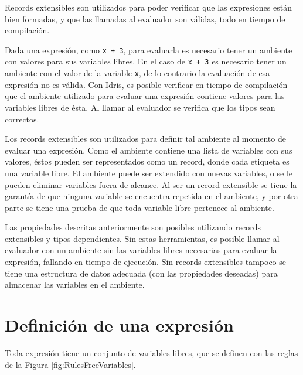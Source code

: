 Records extensibles son utilizados para poder verificar que las expresiones están bien formadas, y que las llamadas al evaluador son válidas, todo en tiempo de compilación.

Dada una expresión, como \texttt{x + 3}, para evaluarla es necesario tener un ambiente con valores para sus variables libres. En el caso de \texttt{x + 3} es necesario tener un ambiente con el valor de la variable \texttt{x}, de lo contrario la evaluación de esa expresión no es válida. Con Idris, es posible verificar en tiempo de compilación que el ambiente utilizado para evaluar una expresión contiene valores para las variables libres de ésta. Al llamar al evaluador se verifica que los tipos sean correctos.

Los records extensibles son utilizados para definir tal ambiente al momento de evaluar una expresión. Como el ambiente contiene una lista de variables con sus valores, éstos pueden ser representados como un record, donde cada etiqueta es una variable libre. El ambiente puede ser extendido con nuevas variables, o se le pueden eliminar variables fuera de alcance. Al ser un record extensible se tiene la garantía de que ninguna variable se encuentra repetida en el ambiente, y por otra parte se tiene una prueba de que toda variable libre pertenece al ambiente.

Las propiedades descritas anteriormente son posibles utilizando records extensibles y tipos dependientes. Sin estas herramientas, es posible llamar al evaluador con un ambiente sin las variables libres necesarias para evaluar la expresión, fallando en tiempo de ejecución. Sin records extensibles tampoco se tiene una estructura de datos adecuada (con las propiedades deseadas) para almacenar las variables en el ambiente.

\section{Definición de una expresión}

Toda expresión tiene un conjunto de variables libres, que se definen con las reglas de la Figura \ref{fig:RulesFreeVariables}.

